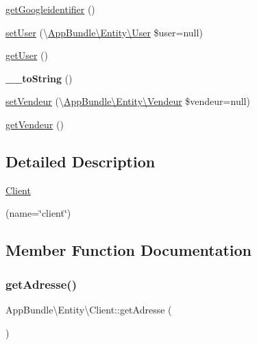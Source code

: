 \begin{DoxyCompactItemize}
\hyperlink{class_app_bundle_1_1_entity_1_1_client_a0b590b20e2e293c2cce94112daff4170}{get\+Googleidentifier} ()
\item 
\hyperlink{class_app_bundle_1_1_entity_1_1_client_aad97e5148a8c5099ca2ccc597db9e562}{set\+User} (\textbackslash{}\hyperlink{class_app_bundle_1_1_entity_1_1_user}{App\+Bundle\textbackslash{}\+Entity\textbackslash{}\+User} \$user=null)
\item 
\hyperlink{class_app_bundle_1_1_entity_1_1_client_a145c76dd4edcd2b551d4b2ec57e78d24}{get\+User} ()
\item 
\mbox{\label{class_app_bundle_1_1_entity_1_1_client_afe670af2b6754e4cbbc5387b52fd9aa0}} 
{\bfseries \+\_\+\+\_\+to\+String} ()
\item 
\hyperlink{class_app_bundle_1_1_entity_1_1_client_a884be53721153a7adafe2dda81c22d8e}{set\+Vendeur} (\textbackslash{}\hyperlink{class_app_bundle_1_1_entity_1_1_vendeur}{App\+Bundle\textbackslash{}\+Entity\textbackslash{}\+Vendeur} \$vendeur=null)
\item 
\hyperlink{class_app_bundle_1_1_entity_1_1_client_a4a6c60e5a3bb67e03058f5230e85b99b}{get\+Vendeur} ()
\end{DoxyCompactItemize}


\subsection{Detailed Description}
\hyperlink{class_app_bundle_1_1_entity_1_1_client}{Client}

(name=\char`\"{}client\char`\"{})  

\subsection{Member Function Documentation}
\mbox{\label{class_app_bundle_1_1_entity_1_1_client_a5723a5d28f0c6744ff4e5ec2b4b7624a}} 
\subsubsection{\texorpdfstring{get\+Adresse()}{getAdresse()}}
{\footnotesize\ttfamily App\+Bundle\textbackslash{}\+Entity\textbackslash{}\+Client\+::get\+Adresse (\begin{DoxyParamCaption}{ }\end{DoxyParamCaption})}

